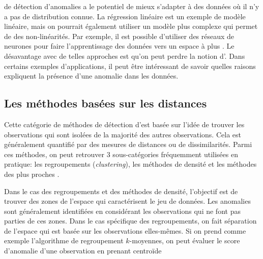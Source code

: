 \DIFdelbegin {}\DIFdelend \DIFaddbegin {}\DIFaddend de détection d'anomalies a le potentiel de mieux s'adapter à des données où il n'y a pas de distribution connue. La régression linéaire est un exemple de modèle linéaire, mais on pourrait également utiliser un modèle plus complexe qui permet de \DIFdelbegin {}\DIFdelend \DIFaddbegin {}\DIFaddend des non-linéarités. Par exemple, il est possible d'utiliser des réseaux de neurones pour faire l'apprentissage des données vers un espace à plus \DIFdelbegin {}\DIFdelend \DIFaddbegin {}\DIFaddend . Le désavantage avec de telles approches est qu'on peut perdre la notion d'\DIFdelbegin {}\DIFdelend \DIFaddbegin {}\DIFaddend . Dans certains exemples d'applications, il peut être intéressant de savoir quelles raisons expliquent la présence d'une anomalie dans les données.

\subsection{Les méthodes basées sur les distances}

Cette catégorie de méthodes de détection d'\DIFdelbegin {}\DIFdelend \DIFaddbegin {}\DIFaddend est basée sur l'idée de trouver les observations qui sont isolées de la majorité des autres observations. Cela est généralement quantifié par des mesures de distances ou de dissimilarités. Parmi ces méthodes, on peut retrouver 3 sous-catégories fréquemment utilisées en pratique: les regroupements (\textit{clustering}), les méthodes de densité et les méthodes des plus proches \DIFdelbegin {}\DIFdelend \DIFaddbegin {}\DIFaddend .

Dans le cas des regroupements et des méthodes de densité, l'objectif est de trouver des zones de l'espace qui caractérisent le jeu de données. Les anomalies sont généralement identifiées en considérant les observations qui ne font pas parties de ces zones. Dans le cas spécifique des regroupements, on fait \DIFdelbegin {}\DIFdelend \DIFaddbegin {}\DIFaddend séparation de l'espace qui est basée sur les observations elles-mêmes. Si on prend comme exemple l'algorithme de regroupement $k$-moyennes, on peut évaluer le score d'anomalie d'une observation en prenant \DIFdelbegin {}\DIFdelend \DIFaddbegin {}\DIFaddend centroïde \DIFdelbegin {}\DIFdelend \DIFaddbegin {}\textit{} \textit{} \DIFaddend 

